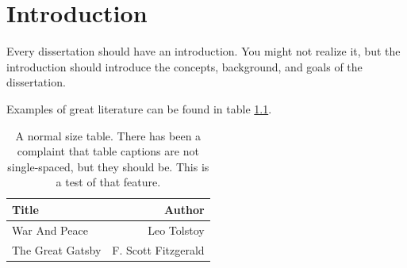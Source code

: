 

\chapter{Introduction}

Every dissertation should have an introduction.  You might not realize
it, but the introduction should introduce the concepts, background,
and goals of the dissertation.

Examples of great literature can be found in table \ref{tab:example-1}.

\begin{table}[htbp]
  \caption[A normal size table.]{A normal size table. There has been a complaint
    that table captions are not single-spaced, but they should be. This is a
    test of that feature.}
  \label{tab:example-1}
  \begin{center}
    \begin{tabular}{|l|r|}
      \hline 
      Title & Author \\
      \hline
      War And Peace & Leo Tolstoy \\
      The Great Gatsby & F. Scott Fitzgerald \\ \hline
    \end{tabular}
  \end{center}
\end{table}

